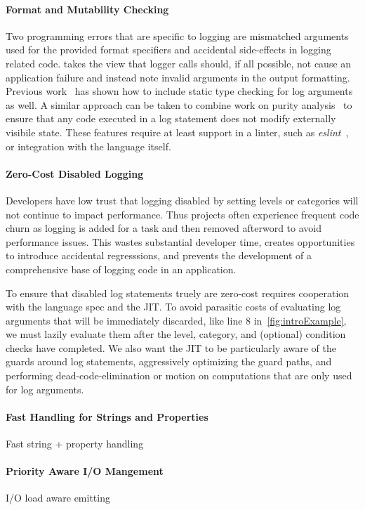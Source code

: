 \paragraph{Format and Mutability Checking}
\noindent
Two programming errors that are specific to logging are mismatched arguments used 
for the provided format specifiers and accidental side-effects in logging related 
code. \projn takes the view that logger calls should, if all possible, not cause 
an application failure and instead note invalid arguments in the output formatting. 
Previous work~\cite{tyepcheckprintf} has shown how to include static type 
checking for log arguments as well. A similar approach can be taken to combine 
work on purity analysis~\cite{purity1,purity2} to ensure that any code executed 
in a log statement does not modify externally visibile state. These features require 
at least support in a linter, such as \emph{eslint}~\cite{eslint}, or integration 
with the language itself.

\paragraph{Zero-Cost Disabled Logging}
\noindent
Developers have low trust that logging disabled by setting levels or categories 
will not continue to impact performance. Thus projects often experience frequent 
code churn as logging is added for a task and then removed afterword to avoid 
performance issues. This wastes substantial developer time, creates opportunities 
to introduce accidental regresssions, and prevents the development of a comprehensive 
base of logging code in an application. 

To ensure that disabled log statements truely are zero-cost requires cooperation 
with the language spec and the JIT. To avoid parasitic costs of evaluating log 
arguments that will be immediately discarded, like line 8 in~\autoref{fig:introExample}, 
we must lazily evaluate them after the level, category, and (optional) condition 
checks have completed. We also want the JIT to be particularly aware of the guards 
around log statements, aggressively optimizing the guard paths, and performing 
dead-code-elimination or motion on computations that are only used for log arguments.

\paragraph{Fast Handling for Strings and Properties}
\noindent
Fast string + property handling

\paragraph{Priority Aware I/O Mangement}
\noindent
I/O load aware emitting
